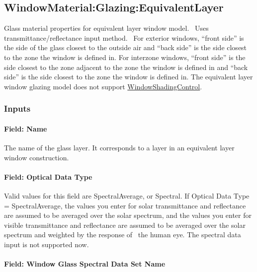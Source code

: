 \subsection{WindowMaterial:Glazing:EquivalentLayer}\label{windowmaterialglazingequivalentlayer}

Glass material properties for equivalent layer window model.~ Uses transmittance/reflectance input method.~ For exterior windows, ``front side'' is the side of the glass closest to the outside air and ``back side'' is the side closest to the zone the window is defined in. For interzone windows, ``front side'' is the side closest to the zone adjacent to the zone the window is defined in and ``back side'' is the side closest to the zone the window is defined in. The equivalent layer window glazing model does not support \hyperref[windowpropertyshadingcontrol]{WindowShadingControl}.

\subsubsection{Inputs}\label{inputs-30-001}

\paragraph{Field: Name}\label{field-name-24-002}

The name of the glass layer. It corresponds to a layer in an equivalent layer window construction.

\paragraph{Field: Optical Data Type}\label{field-optical-data-type-1}

Valid values for this field are SpectralAverage, or Spectral. If Optical Data Type = SpectralAverage, the values you enter for solar transmittance and reflectance are assumed to be averaged over the solar spectrum, and the values you enter for visible transmittance and reflectance are assumed to be averaged over the solar spectrum and weighted by the response of~ the human eye. The spectral data input is not supported now.

\paragraph{Field: Window Glass Spectral Data Set Name}\label{field-window-glass-spectral-data-set-name-0}

